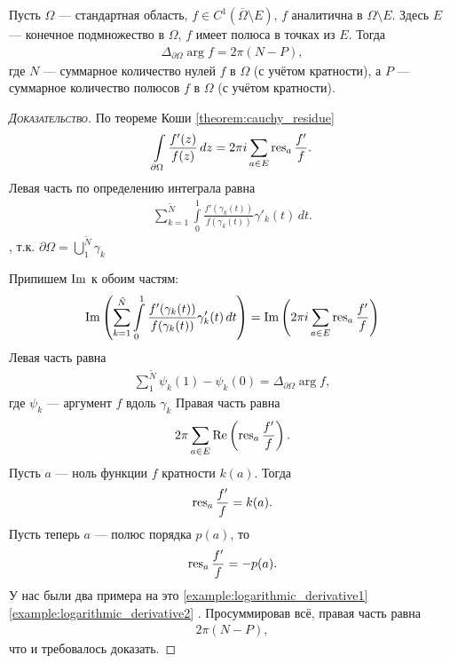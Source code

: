 \documentclass[../complex-analysis.tex]{subfiles}
\begin{document}
\begin{thm}
 Пусть $ \Omega $ --- стандартная область, $ f \in C^{1}(\overline \Omega \setminus E) $, $ f $ аналитична в $ \Omega \setminus E $. Здесь $ E $ --- конечное подмножество в $ \Omega $, $ f $ имеет полюса в точках из $ E $. Тогда
 \begin{align*}
  \Delta_{\partial \Omega} \arg f = 2\pi(N - P),
 \end{align*} где $ N $ --- суммарное количество нулей $ f $ в $ \Omega $ (с учётом кратности), а $ P $ --- суммарное количество  полюсов $ f $ в $ \Omega $ (с учётом кратности).
\end{thm}
\begin{proof}[\normalfont\textsc{Доказательство}]
По теореме Коши \eqref{theorem:cauchy_residue}
 \begin{align*}
  \int\limits_{\partial\Omega} \frac{f'(z)}{f(z)} \,dz = 2\pi i \sum_{a \in E} \operatorname{res}_a \frac{f'}{f}.
 \end{align*} Левая часть по определению интеграла равна
 \begin{align*}
  \sum_{k=1}^{\tilde N} \int\limits_{0}^{1} \frac{f'(\gamma_k(t))}{f(\gamma_k(t))}\gamma'_k(t)\,dt.
\end{align*}, т.к. $\partial \Omega = \bigcup_{1}^{\tilde N} \gamma_k$ 

 Припишем $ \operatorname{Im}$ к обоим частям:
 \begin{align*}
  \operatorname{Im} \left(\sum_{k=1}^{\tilde N} \int\limits_{0}^{1} \frac{f'(\gamma_k(t))}{f(\gamma_k(t))}\gamma'_k(t)\,dt\right) = \operatorname{Im} \left( 2\pi i \sum_{a \in E}\operatorname{res}_a \frac{f'}{f} \right)
 \end{align*} Левая часть равна
 \begin{align*}
  \sum_{1}^{\tilde N} \psi_k(1) - \psi_k(0) = \Delta_{\partial \Omega} \arg f,
 \end{align*} где $ \psi_k $ --- аргумент $ f $ вдоль $ \gamma_k $ Правая часть равна
 \begin{align*}
  2\pi \sum_{a \in E} \operatorname{Re} \left( \operatorname{res}_a \frac{f'}{f} \right).
 \end{align*} Пусть $ a $ --- ноль функции $ f $ кратности $ k(a) $. Тогда
 \begin{align*}
  \operatorname{res}_a \frac{f'}{f} = k(a).
 \end{align*} Пусть теперь $ a $ --- полюс порядка $ p(a) $, то
 \begin{align*}
  \operatorname{res}_a \frac{f'}{f} = -p(a).
\end{align*} У нас были два примера на это \eqref{example:logarithmic_derivative1} \eqref{example:logarithmic_derivative2} . Просуммировав всё, правая часть равна
 \begin{align*}
  2\pi (N-P),
 \end{align*} что и требовалось доказать.
\end{proof}
\end{document}

